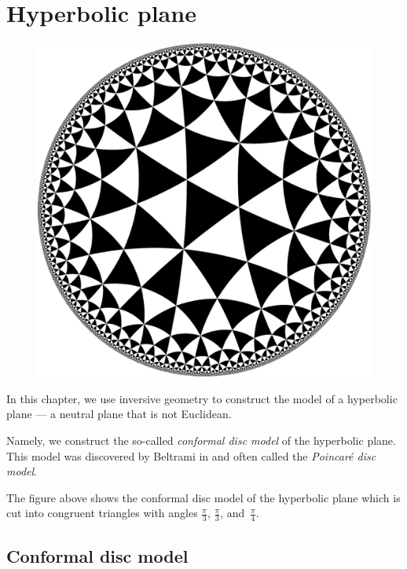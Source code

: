 \chapter{Hyperbolic plane}\label{chap:poincare}

\begin{figure}[h!]
\vspace*{-9mm}
\centering
\includegraphics[scale=0.25]{pics/H2checkers_334}
\end{figure}

In this chapter, we use inversive geometry 
to construct the model of a hyperbolic plane --- a neutral plane that is not Euclidean.

Namely, we construct the so-called \emph{conformal disc model} of the hyperbolic plane.
This model was discovered by Beltrami in \cite{beltrami} 
and often called the {}\emph{Poincar\'e disc model}. 

The figure above shows the conformal disc model of the hyperbolic plane which is cut into congruent triangles with angles $\tfrac\pi3$, $\tfrac\pi3$, and~$\tfrac\pi4$.

\section*{Conformal disc model}

